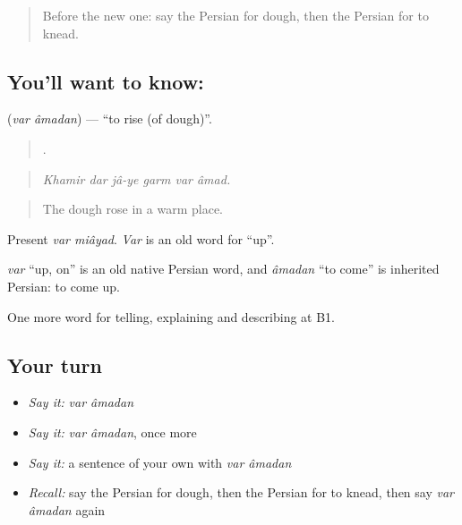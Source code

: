 \label{lesson:FA-C357-var-amadan}



\begin{quote}
Before the new one: say the Persian for dough, then the Persian for to knead.
\end{quote}

\subsection*{You'll want to know:  }
\textbf{ } (\emph{var âmadan}) — \textquotedblleft{}to rise (of dough)\textquotedblright{}.

\begin{quote}
     .
\end{quote}

\begin{quote}
\emph{Khamir dar jâ-ye garm var âmad.}
\end{quote}

\begin{quote}
The dough rose in a warm place.
\end{quote}

Present \emph{var miâyad}. \emph{Var} is an old word for \textquotedblleft{}up\textquotedblright{}.

\begin{cousinweb}
\emph{var} \textquotedblleft{}up, on\textquotedblright{} is an old native Persian word, and \emph{âmadan} \textquotedblleft{}to come\textquotedblright{} is inherited Persian: to come up.
\end{cousinweb}

\begin{grammarlens}[title={What you've built}]
One more word for telling, explaining and describing at B1.
\end{grammarlens}

\subsection*{Your turn}
\begin{itemize}
\raggedright
  \item \emph{Say it:} \emph{var âmadan}
  \item \emph{Say it:} \emph{var âmadan}, once more
  \item \emph{Say it:} a sentence of your own with \emph{var âmadan}
  \item \emph{Recall:} say the Persian for dough, then the Persian for to knead, then say \emph{var âmadan} again
\end{itemize}

